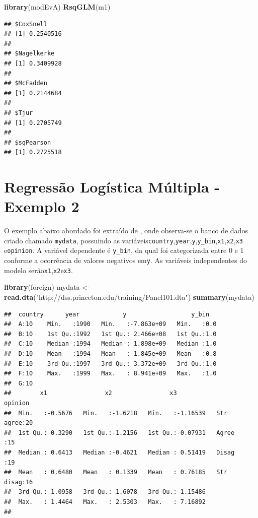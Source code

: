 \documentclass[12pt,brazil,]{book}
\newenvironment{Shaded}{\begin{snugshade}}{\end{snugshade}}
\newcommand{\KeywordTok}[1]{\textcolor[rgb]{0.13,0.29,0.53}{\textbf{#1}}}
\newcommand{\NormalTok}[1]{#1}
\newcommand{\StringTok}[1]{\textcolor[rgb]{0.31,0.60,0.02}{#1}}
\begin{document}
\begin{Shaded}
\begin{Highlighting}[]
\KeywordTok{library}\NormalTok{(modEvA)}
\KeywordTok{RsqGLM}\NormalTok{(m1)}
\end{Highlighting}
\end{Shaded}

\begin{verbatim}
## $CoxSnell
## [1] 0.2540516
## 
## $Nagelkerke
## [1] 0.3409928
## 
## $McFadden
## [1] 0.2144684
## 
## $Tjur
## [1] 0.2705749
## 
## $sqPearson
## [1] 0.2725518
\end{verbatim}

\hypertarget{regressao-logistica-multipla---exemplo-2}{%
\section{Regressão Logística Múltipla - Exemplo
2}\label{regressao-logistica-multipla---exemplo-2}}

O exemplo abaixo abordado foi extraído de \textcite{Torres-Reyna2014},
onde observa-se o banco de dados criado chamado \texttt{mydata},
possuindo as
variáveis\texttt{country},\texttt{year},\texttt{y},\texttt{y\_bin},\texttt{x1},\texttt{x2},\texttt{x3}
e\texttt{opinion}. A variável dependente é \texttt{y\_bin}, da qual foi
categorizada entre 0 e 1 conforme a ocorrência de valores negativos
em\texttt{y}. As variáveis independentes do modelo
serão\texttt{x1},\texttt{x2}e\texttt{x3}.

\begin{Shaded}
\begin{Highlighting}[]
\KeywordTok{library}\NormalTok{(foreign)}
\NormalTok{mydata <-}\StringTok{ }\KeywordTok{read.dta}\NormalTok{(}\StringTok{"http://dss.princeton.edu/training/Panel101.dta"}\NormalTok{) }
\KeywordTok{summary}\NormalTok{(mydata)}
\end{Highlighting}
\end{Shaded}

\begin{verbatim}
##  country      year            y                  y_bin    
##  A:10    Min.   :1990   Min.   :-7.863e+09   Min.   :0.0  
##  B:10    1st Qu.:1992   1st Qu.: 2.466e+08   1st Qu.:1.0  
##  C:10    Median :1994   Median : 1.898e+09   Median :1.0  
##  D:10    Mean   :1994   Mean   : 1.845e+09   Mean   :0.8  
##  E:10    3rd Qu.:1997   3rd Qu.: 3.372e+09   3rd Qu.:1.0  
##  F:10    Max.   :1999   Max.   : 8.941e+09   Max.   :1.0  
##  G:10                                                     
##        x1                x2                x3                opinion  
##  Min.   :-0.5676   Min.   :-1.6218   Min.   :-1.16539   Str agree:20  
##  1st Qu.: 0.3290   1st Qu.:-1.2156   1st Qu.:-0.07931   Agree    :15  
##  Median : 0.6413   Median :-0.4621   Median : 0.51419   Disag    :19  
##  Mean   : 0.6480   Mean   : 0.1339   Mean   : 0.76185   Str disag:16  
##  3rd Qu.: 1.0958   3rd Qu.: 1.6078   3rd Qu.: 1.15486                 
##  Max.   : 1.4464   Max.   : 2.5303   Max.   : 7.16892                 
## 
\end{verbatim}
\end{document}
